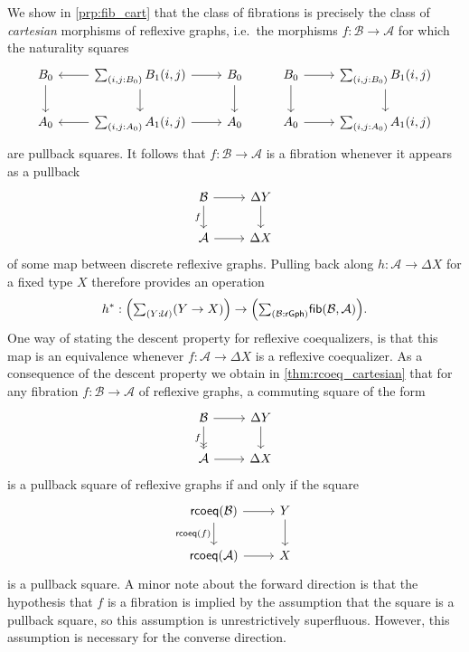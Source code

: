 We show in \cref{prp:fib_cart} that the class of fibrations is precisely the class of \emph{cartesian} morphisms of reflexive graphs, i.e.~the morphisms $f:\mathcal{B}\to\mathcal{A}$ for which the naturality squares
\begin{equation*}
\begin{tikzcd}
\pts{B} \arrow[d] & \sm{i,j:\pts{B}}\edg{B}(i,j) \arrow[d] \arrow[r] \arrow[l] & \pts{B} \arrow[d] & \pts{B} \arrow[r] \arrow[d] & \sm{i,j:\pts{B}}\edg{B}(i,j) \arrow[d] \\
\pts{A} & \sm{i,j:\pts{A}}\edg{A}(i,j) \arrow[l] \arrow[r] & \pts{A} & \pts{A} \arrow[r] & \sm{i,j:\pts{A}}\edg{A}(i,j)
\end{tikzcd}
\end{equation*}
are pullback squares. It follows that $f:\mathcal{B}\to\mathcal{A}$ is a fibration whenever it appears as a pullback
\begin{equation*}
\begin{tikzcd}
\mathcal{B} \arrow[d,swap,"f"] \arrow[r] & \Delta Y \arrow[d] \\
\mathcal{A} \arrow[r] & \Delta X
\end{tikzcd}
\end{equation*}
of some map between discrete reflexive graphs. Pulling back along $h:\mathcal{A}\to\Delta X$ for a fixed type $X$ therefore provides an operation
\begin{equation*}
h^\ast : \Big(\sm{Y:\UU}(Y\to X)\Big)\to \Big(\sm{\mathcal{B}:\mathsf{rGph}}\mathsf{fib}(\mathcal{B},\mathcal{A})\Big).
\end{equation*}
One way of stating the descent property for reflexive coequalizers, is that this map is an equivalence whenever $f:\mathcal{A}\to\Delta X$ is a reflexive coequalizer. As a consequence of the descent property we obtain in \cref{thm:rcoeq_cartesian} that for any fibration $f:\mathcal{B}\to\mathcal{A}$ of reflexive graphs, a commuting square of the form
\begin{equation*}
\begin{tikzcd}
\mathcal{B} \arrow[d,->>,swap,"f"] \arrow[r] & \Delta Y \arrow[d] \\
\mathcal{A} \arrow[r] & \Delta X
\end{tikzcd}
\end{equation*}
is a pullback square of reflexive graphs if and only if the square
\begin{equation*}
\begin{tikzcd}
\mathsf{rcoeq}(\mathcal{B}) \arrow[d,swap,"\mathsf{rcoeq}(f)"] \arrow[r] & Y \arrow[d] \\
\mathsf{rcoeq}(\mathcal{A}) \arrow[r] & X
\end{tikzcd}
\end{equation*}
is a pullback square. A minor note about the forward direction is that the hypothesis that $f$ is a fibration is implied by the assumption that the square is a pullback square, so this assumption is unrestrictively superfluous. However, this assumption is necessary for the converse direction.

